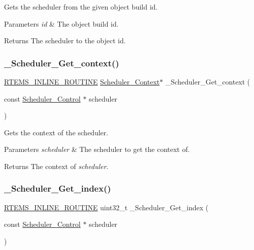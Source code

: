 Gets the scheduler from the given object build id. 


\begin{DoxyParams}{Parameters}
{\em id} & The object build id.\\
\hline
\end{DoxyParams}
\begin{DoxyReturn}{Returns}
The scheduler to the object id. 
\end{DoxyReturn}
\mbox{\label{group__RTEMSScoreScheduler_ga9c62ef5a388b998fa041a269297be1fe}} 
\subsubsection{\texorpdfstring{\_Scheduler\_Get\_context()}{\_Scheduler\_Get\_context()}}
{\footnotesize\ttfamily \mbox{\hyperlink{group__RTEMSScoreBaseDefs_gac216239df231d5dbd15e3520b0b9313f}{R\+T\+E\+M\+S\+\_\+\+I\+N\+L\+I\+N\+E\+\_\+\+R\+O\+U\+T\+I\+NE}} \mbox{\hyperlink{structScheduler__Context}{Scheduler\+\_\+\+Context}}$\ast$ \+\_\+\+Scheduler\+\_\+\+Get\+\_\+context (\begin{DoxyParamCaption}\item[{const \mbox{\hyperlink{struct__Scheduler__Control}{Scheduler\+\_\+\+Control}} $\ast$}]{scheduler }\end{DoxyParamCaption})}



Gets the context of the scheduler. 


\begin{DoxyParams}{Parameters}
{\em scheduler} & The scheduler to get the context of.\\
\hline
\end{DoxyParams}
\begin{DoxyReturn}{Returns}
The context of {\itshape scheduler}. 
\end{DoxyReturn}
\mbox{\label{group__RTEMSScoreScheduler_ga22b124b409502e8e91d3faeab16367ac}} 
\subsubsection{\texorpdfstring{\_Scheduler\_Get\_index()}{\_Scheduler\_Get\_index()}}
{\footnotesize\ttfamily \mbox{\hyperlink{group__RTEMSScoreBaseDefs_gac216239df231d5dbd15e3520b0b9313f}{R\+T\+E\+M\+S\+\_\+\+I\+N\+L\+I\+N\+E\+\_\+\+R\+O\+U\+T\+I\+NE}} uint32\+\_\+t \+\_\+\+Scheduler\+\_\+\+Get\+\_\+index (\begin{DoxyParamCaption}\item[{const \mbox{\hyperlink{struct__Scheduler__Control}{Scheduler\+\_\+\+Control}} $\ast$}]{scheduler }\end{DoxyParamCaption})}



